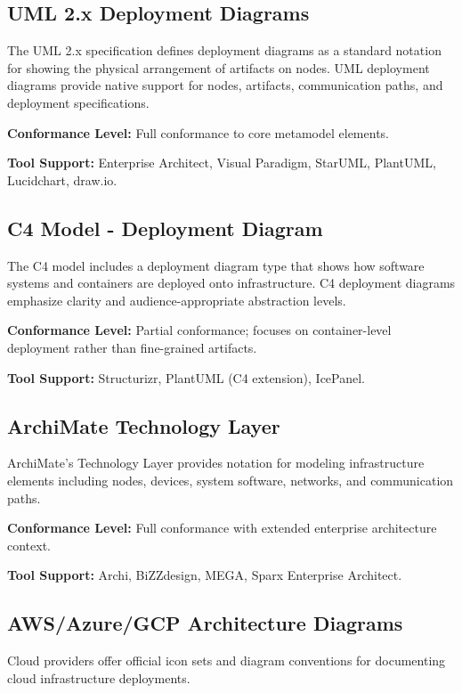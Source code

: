 \documentclass[11pt,letterpaper]{article}
\begin{document}
\subsection{UML 2.x Deployment Diagrams}

The UML 2.x specification defines deployment diagrams as a standard notation for showing the physical arrangement of artifacts on nodes. UML deployment diagrams provide native support for nodes, artifacts, communication paths, and deployment specifications.

\textbf{Conformance Level:} Full conformance to core metamodel elements.

\textbf{Tool Support:} Enterprise Architect, Visual Paradigm, StarUML, PlantUML, Lucidchart, draw.io.

\subsection{C4 Model - Deployment Diagram}

The C4 model includes a deployment diagram type that shows how software systems and containers are deployed onto infrastructure. C4 deployment diagrams emphasize clarity and audience-appropriate abstraction levels.

\textbf{Conformance Level:} Partial conformance; focuses on container-level deployment rather than fine-grained artifacts.

\textbf{Tool Support:} Structurizr, PlantUML (C4 extension), IcePanel.

\subsection{ArchiMate Technology Layer}

ArchiMate's Technology Layer provides notation for modeling infrastructure elements including nodes, devices, system software, networks, and communication paths.

\textbf{Conformance Level:} Full conformance with extended enterprise architecture context.

\textbf{Tool Support:} Archi, BiZZdesign, MEGA, Sparx Enterprise Architect.

\subsection{AWS/Azure/GCP Architecture Diagrams}

Cloud providers offer official icon sets and diagram conventions for documenting cloud infrastructure deployments.
\end{document}
